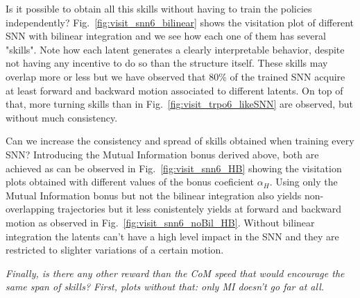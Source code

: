 \documentclass{article} %
\begin{document}
Is it possible to obtain all this skills without having to train the policies independently? Fig.\ \ref{fig:visit_snn6_bilinear} shows the visitation plot of different SNN with bilinear integration and we see how each one of them has several "skills". Note how each latent generates a clearly interpretable behavior, despite not having any incentive to do so than the structure itself. These skills may overlap more or less but we have observed that 80\% of the trained SNN acquire at least forward and backward motion associated to different latents. On top of that, more turning skills than in Fig.\ \ref{fig:visit_trpo6_likeSNN} are observed, but without much consistency.

Can we increase the consistency and spread of skills obtained when training every SNN? Introducing the Mutual Information bonus derived above, both are achieved as can be observed in Fig.\ \ref{fig:visit_snn6_HB} showing the visitation plots obtained with different values of the bonus coeficient $\alpha_H$. Using only the Mutual Information bonus but not the bilinear integration also yields non-overlapping trajectories but it less conistentely yields at forward and backward motion as observed in Fig.\ \ref{fig:visit_snn6_noBil_HB}. Without bilinear integration the latents can't have a high level impact in the SNN and they are restricted to slighter variations of a certain motion.

\textit{Finally, is there any other reward than the CoM speed that would encourage the same span of skills? First, plots without that: only MI doesn't go far at all.}
\end{document}
